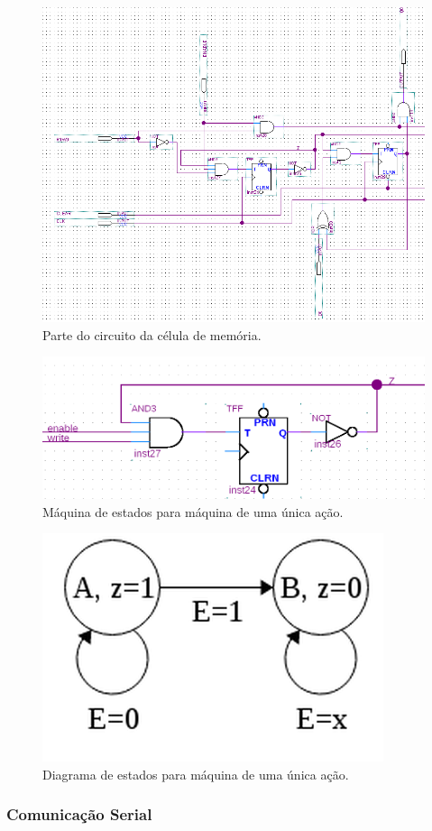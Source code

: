 \documentclass[12pt]{article}
\begin{document}
\begin{figure}[h]
\centering
\includegraphics[width=.8\textwidth]{img/internoram.png}
\caption{Parte do circuito da célula de memória.}
\label{fig:cellram}
\end{figure}


\begin{figure}[h]
\centering
\includegraphics[width=.8\textwidth]{img/ff1.png}
\caption{Máquina de estados para máquina de uma única ação.}
\label{fig:ff1}
\end{figure}

\begin{figure}[h]
\centering
\includegraphics[width=.3\textwidth]{img/fsm.png}
\caption{Diagrama de estados para máquina de uma única ação.}
\label{fig:fsm}
\end{figure}


\subsubsection{Comunicação Serial}
\end{document}
